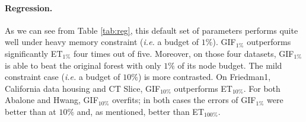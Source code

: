 \documentclass{article}
\begin{document}
\paragraph{Regression.}
As we can see from Table \ref{tab:reg}, this default set of parameters performs 
quite well under heavy memory constraint ({\it i.e.} a budget of $1\%$). 
GIF$_{1\%}$ outperforms significantly ET$_{1\%}$ four times out of five. 
Moreover, on those four datasets, GIF$_{1\%}$ is able to beat the original 
forest with only $1\%$ of its node budget.
The mild constraint case ({\it i.e.} a budget of $10\%$) is more contrasted.
On Friedman1, California data housing and CT Slice, GIF$_{10\%}$ 
outperforms ET$_{10\%}$. For both Abalone and Hwang, GIF$_{10\%}$ overfits; in 
both cases the errors of GIF$_{1\%}$ were better than at $10\%$ and, 
as mentioned, better than ET$_{100\%}$.
\end{document}
